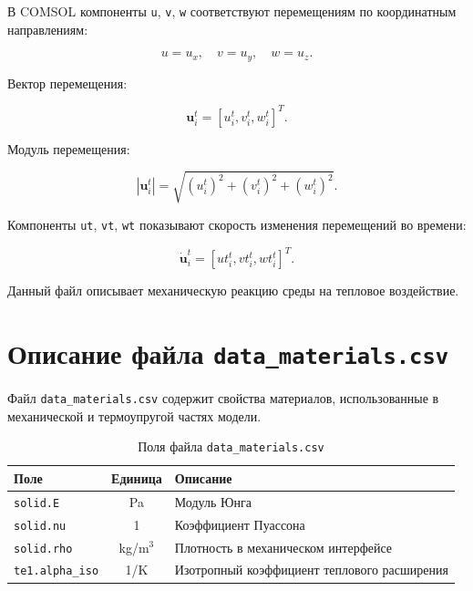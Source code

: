 В COMSOL компоненты \texttt{u}, \texttt{v}, \texttt{w} соответствуют перемещениям по координатным направлениям:

\begin{equation}
u=u_x, \quad v=u_y, \quad w=u_z.
\end{equation}

Вектор перемещения:

\begin{equation}
\mathbf{u}_i^t=[u_i^t,v_i^t,w_i^t]^T.
\end{equation}

Модуль перемещения:

\begin{equation}
|\mathbf{u}_i^t|=\sqrt{(u_i^t)^2+(v_i^t)^2+(w_i^t)^2}.
\end{equation}

Компоненты \texttt{ut}, \texttt{vt}, \texttt{wt} показывают скорость изменения перемещений во времени:

\begin{equation}
\dot{\mathbf{u}}_i^t=[ut_i^t,vt_i^t,wt_i^t]^T.
\end{equation}

Данный файл описывает механическую реакцию среды на тепловое воздействие.

\section{Описание файла \texttt{data\_materials.csv}}

Файл \texttt{data\_materials.csv} содержит свойства материалов, использованные в механической и термоупругой частях модели.

\begin{table}[h!]
\centering
\caption{Поля файла \texttt{data\_materials.csv}}
\label{tab:data_materials}
\begin{tabular}{|l|c|p{8cm}|}
\hline
\textbf{Поле} & \textbf{Единица} & \textbf{Описание} \\
\hline
\texttt{solid.E} & Pa & Модуль Юнга \\
\hline
\texttt{solid.nu} & 1 & Коэффициент Пуассона \\
\hline
\texttt{solid.rho} & kg/m$^3$ & Плотность в механическом интерфейсе \\
\hline
\texttt{te1.alpha\_iso} & 1/K & Изотропный коэффициент теплового расширения \\
\hline
\end{tabular}
\end{table}

